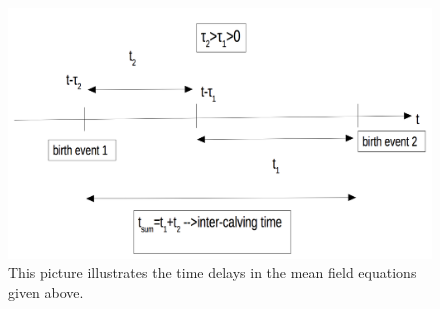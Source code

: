 \begin{figure}[htbp]
\centering
\noindent\includegraphics[width=\linewidth,height=\textheight,
keepaspectratio]{infectionTimeScale.png} \caption[Visualization of time delays in the mean field model]{This picture illustrates the time delays in the mean field equations given above.}
\label{fig:infectionTimeScale}
\end{figure}

